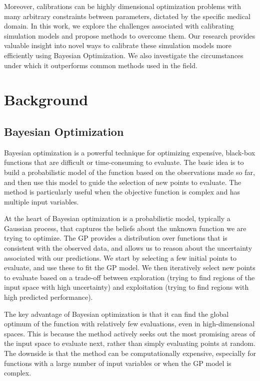 \documentclass[sn-mathphys,Numbered]{sn-jnl}%
\begin{document}
Moreover, calibrations can be highly dimensional optimization problems with many arbitrary constraints between parameters, dictated by the specific medical domain. In this work, we explore the challenges associated with calibrating simulation models and propose methods to overcome them. Our research provides valuable insight into novel ways to calibrate these simulation models more efficiently using Bayesian Optimization. We also investigate the circumstances under which it outperforms common methods used in the field.	

\section{Background}

\subsection{Bayesian Optimization}

Bayesian optimization is a powerful technique for optimizing expensive, black-box functions that are difficult or time-consuming to evaluate. The basic idea is to build a probabilistic model of the function based on the observations made so far, and then use this model to guide the selection of new points to evaluate. The method is particularly useful when the objective function is complex and has multiple input variables.

At the heart of Bayesian optimization is a probabilistic model, typically a Gaussian process, that captures the beliefs about the unknown function we are trying to optimize. The GP provides a distribution over functions that is consistent with the observed data, and allows us to reason about the uncertainty associated with our predictions. We start by selecting a few initial points to evaluate, and use these to fit the GP model. We then iteratively select new points to evaluate based on a trade-off between exploration (trying to find regions of the input space with high uncertainty) and exploitation (trying to find regions with high predicted performance).

The key advantage of Bayesian optimization is that it can find the global optimum of the function with relatively few evaluations, even in high-dimensional spaces. This is because the method actively seeks out the most promising areas of the input space to evaluate next, rather than simply evaluating points at random. The downside is that the method can be computationally expensive, especially for functions with a large number of input variables or when the GP model is complex.
\end{document}

